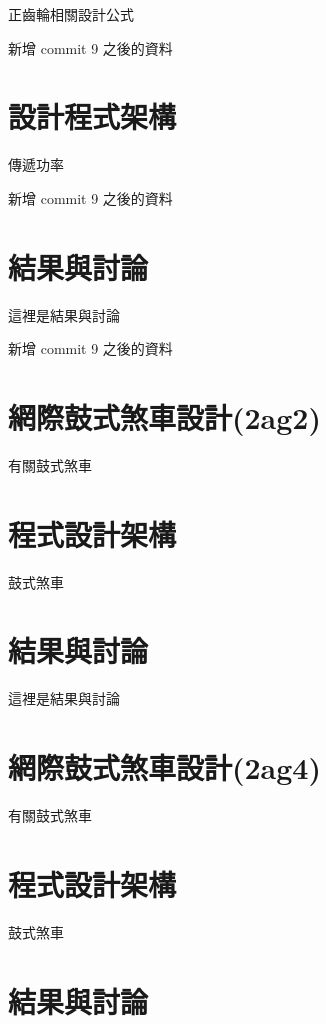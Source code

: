 \documentclass[]{article}
\begin{document}
正齒輪相關設計公式

新增 commit 9 之後的資料

\section{設計程式架構}\label{ux8a2dux8a08ux7a0bux5f0fux67b6ux69cb}

傳遞功率

新增 commit 9 之後的資料

\section{結果與討論}\label{ux7d50ux679cux8207ux8a0eux8ad6}

這裡是結果與討論

新增 commit 9 之後的資料

\section{網際鼓式煞車設計(2ag2)}\label{ux7db2ux969bux9f13ux5f0fux715eux8ecaux8a2dux8a082ag2}

有關鼓式煞車

\section{程式設計架構}\label{ux7a0bux5f0fux8a2dux8a08ux67b6ux69cb}

鼓式煞車

\section{結果與討論}\label{ux7d50ux679cux8207ux8a0eux8ad6-1}

這裡是結果與討論

\section{﻿網際鼓式煞車設計(2ag4)}\label{ux7db2ux969bux9f13ux5f0fux715eux8ecaux8a2dux8a082ag4}

有關鼓式煞車

\section{程式設計架構}\label{ux7a0bux5f0fux8a2dux8a08ux67b6ux69cb-1}

鼓式煞車

\section{結果與討論}\label{ux7d50ux679cux8207ux8a0eux8ad6-2}
\end{document}
